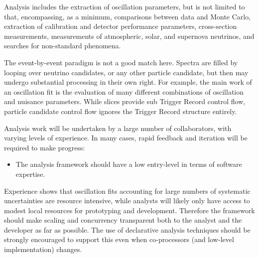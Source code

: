 \documentclass[../main-v1.tex]{subfiles}
\begin{document}
Analysis includes the extraction of oscillation parameters, but is not limited to that, encompassing, as a minimum, comparisons between data and Monte Carlo, extraction of calibration and detector performance parameters, cross-section measurements, measurements of atmospheric, solar, and supernova neutrinos, and searches for non-standard phenomena.

The event-by-event paradigm is not a good match here. Spectra are filled by looping over neutrino candidates, or any other particle candidate, but then may undergo substantial processing in their own right. For example, the main work of an oscillation fit is the evaluation of many different combinations of oscillation and nuisance parameters.  While slices provide sub Trigger Record control flow, particle candidate control flow ignores the Trigger Record structure entirely.






Analysis work will be undertaken by a large number of collaborators, with varying levels of experience. In many cases, rapid feedback and iteration will be required to make progress:

\begin{itemize}
\item The analysis framework should have a low entry-level in terms of software expertise.
\end{itemize}

Experience shows that oscillation fits accounting for large numbers of systematic uncertainties are resource intensive, while analysts will likely only have access to modest local resources for prototyping and development.  Therefore the framework should make scaling and concurrency transparent both to the analyst and the developer as far as possible.  The use of declarative analysis techniques should be strongly encouraged to support this even when co-processors (and low-level implementation) changes.
\end{document}
